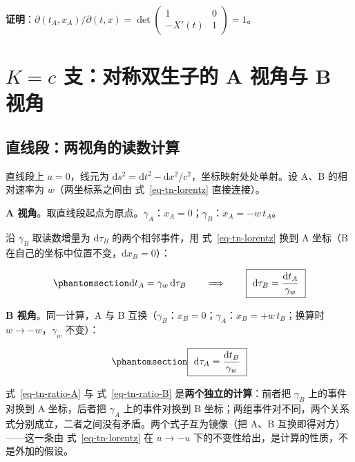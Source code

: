 \documentclass[
  chinese,
  a4paper,
  UTF8,
  12pt,
  oneside,
  openany]{ctexbook}
\theoremstyle{plain}
\theoremstyle{plain}
\theoremstyle{plain}
\theoremstyle{definition}
\theoremstyle{plain}
\theoremstyle{plain}
\theoremstyle{remark}
\begin{document}
\textbf{证明}：\(\partial(t_A,x_A)/\partial(t,x)=\det\begin{pmatrix}1&0\\-X'(t)&1\end{pmatrix}=1\)。

\section{\texorpdfstring{\(K=c\) 支：对称双生子的 A 视角与 B
视角}{K=c 支：对称双生子的 A 视角与 B 视角}}\label{sec-tn-lorentz}

\subsection{直线段：两视角的读数计算}\label{ux76f4ux7ebfux6bb5ux4e24ux89c6ux89d2ux7684ux8bfbux6570ux8ba1ux7b97}

直线段上 \(a=0\)，线元为
\(\mathrm{d}s^{2}=\mathrm{d}t^{2}-\mathrm{d}x^{2}/c^{2}\)，坐标映射处处单射。设
A、B 的相对速率为 \(w\)（两坐标系之间由 式~\ref{eq-tn-lorentz}
直接连接）。

\textbf{A
视角}。取直线段起点为原点。\(\gamma_A\)：\(x_A=0\)；\(\gamma_B\)：\(x_A=-w\,t_A\)。

沿 \(\gamma_B\) 取读数增量为 \(\mathrm{d}\tau_B\) 的两个相邻事件，用
式~\ref{eq-tn-lorentz} 换到 A 坐标（B
在自己的坐标中位置不变，\(\mathrm{d}x_B=0\)）：

\begin{equation}\protect\phantomsection\label{eq-tn-ratio-A}{
\mathrm{d}t_A=\gamma_w\,\mathrm{d}\tau_B
\qquad\Longrightarrow\qquad
\boxed{\ \mathrm{d}\tau_B=\frac{\mathrm{d}t_A}{\gamma_w}\ }
}\end{equation}

\textbf{B 视角}。同一计算，A 与 B
互换（\(\gamma_B\)：\(x_B=0\)；\(\gamma_A\)：\(x_B=+w\,t_B\)；换算时
\(w\to-w\)，\(\gamma_w\) 不变）：

\begin{equation}\protect\phantomsection\label{eq-tn-ratio-B}{
\boxed{\ \mathrm{d}\tau_A=\frac{\mathrm{d}t_B}{\gamma_w}\ }
}\end{equation}

式~\ref{eq-tn-ratio-A} 与 式~\ref{eq-tn-ratio-B}
是\textbf{两个独立的计算}：前者把 \(\gamma_B\) 上的事件对换到 A
坐标，后者把 \(\gamma_A\) 上的事件对换到 B
坐标；两组事件对不同，两个关系式分别成立，二者之间没有矛盾。两个式子互为镜像（把
A、B 互换即得对方）------这一条由 式~\ref{eq-tn-lorentz} 在 \(u\to-u\)
下的不变性给出，是计算的性质，不是外加的假设。
\end{document}
